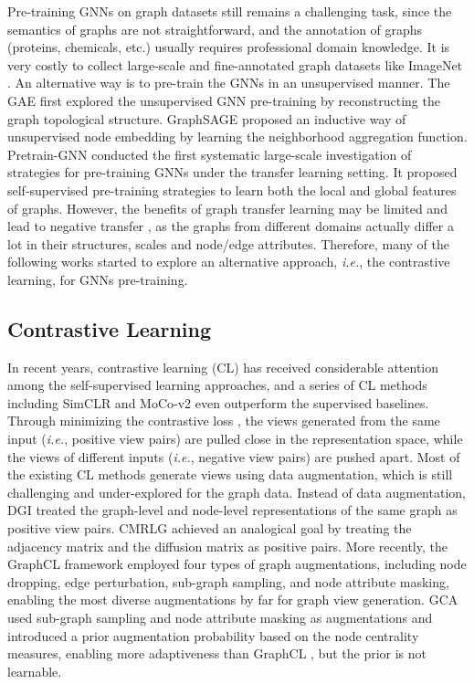 Pre-training GNNs on graph datasets still remains a challenging task, since the semantics of graphs are not straightforward, and the annotation of graphs (proteins, chemicals, etc.) usually requires professional domain knowledge. It is very costly to collect large-scale and fine-annotated graph datasets like ImageNet \cite{krizhevsky2012imagenet}. An alternative way is to pre-train the GNNs in an unsupervised manner. The GAE \cite{kipf2016vgae} first explored the unsupervised GNN pre-training by reconstructing the graph topological structure. GraphSAGE \cite{hamilton2017graphsage} proposed an inductive way of unsupervised node embedding by learning the neighborhood aggregation function. Pretrain-GNN \cite{hu2019pretraingnn} conducted the first systematic large-scale investigation of strategies for pre-training GNNs under the transfer learning setting. It proposed self-supervised pre-training strategies to learn both the local and global features of graphs. However, the benefits of graph transfer learning may be limited and lead to negative transfer \cite{rosenstein2005negtransfer}, as the graphs from different domains actually differ a lot in their structures, scales and node/edge attributes. Therefore, many of the following works started to explore an alternative approach, \textit{i.e.}, the contrastive learning, for GNNs pre-training.

\subsection{Contrastive Learning}

In recent years, contrastive learning (CL) has received considerable attention among the self-supervised learning approaches, and a series of CL methods including SimCLR \cite{chen2020simclr} and MoCo-v2 \cite{chen2020mocov2} even outperform the supervised baselines. Through minimizing the contrastive loss \cite{hadsell2006clloss}, the views generated from the same input (\textit{i.e.}, positive view pairs) are pulled close in the representation space, while the views of different inputs (\textit{i.e.}, negative view pairs) are pushed apart. Most of the existing CL methods \cite{he2020moco,zbontar2021barlowtwins,chen2020simclr, grill2020byol} generate views using data augmentation, which is still challenging and under-explored for the graph data. Instead of data augmentation, DGI \cite{velivckovic2018dgi} treated the graph-level and node-level representations of the same graph as positive view pairs. CMRLG \cite{hassani2020cmcgnn} achieved an analogical goal by treating the adjacency matrix and the diffusion matrix as positive pairs. More recently, the GraphCL framework \cite{you2020graphcl} employed four types of graph augmentations, including node dropping, edge perturbation, sub-graph sampling, and node attribute masking, enabling the most diverse augmentations by far for graph view generation. GCA \cite{zhu2020gca} used sub-graph sampling and node attribute masking as augmentations and introduced a prior augmentation probability based on the node centrality measures, enabling more adaptiveness than GraphCL \cite{you2020graphcl}, but the prior is not learnable.


